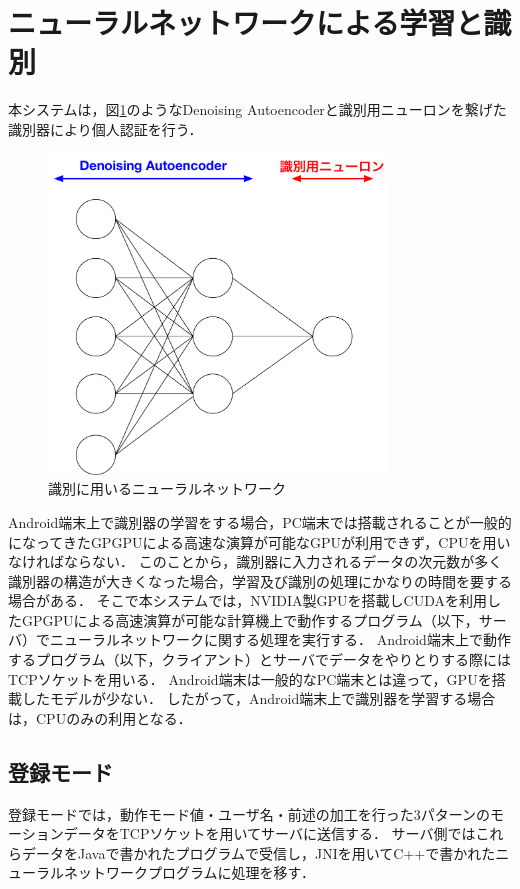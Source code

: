 \section{ニューラルネットワークによる学習と識別}
本システムは，図\ref{system-nn}のようなDenoising Autoencoderと識別用ニューロンを繋げた識別器により個人認証を行う．

\begin{figure}[bthp]
  \centering
  \includegraphics[bb=0 0 622 587, width=9cm]{Figures/system-nn.pdf}
  \caption{識別に用いるニューラルネットワーク}
  \label{system-nn}
\end{figure}

Android端末上で識別器の学習をする場合，PC端末では搭載されることが一般的になってきたGPGPUによる高速な演算が可能なGPUが利用できず，CPUを用いなければならない．
このことから，識別器に入力されるデータの次元数が多く識別器の構造が大きくなった場合，学習及び識別の処理にかなりの時間を要する場合がある．
そこで本システムでは，NVIDIA製GPUを搭載しCUDA\cite{4-cuda}を利用したGPGPUによる高速演算が可能な計算機上で動作するプログラム（以下，サーバ）でニューラルネットワークに関する処理を実行する．
Android端末上で動作するプログラム（以下，クライアント）とサーバでデータをやりとりする際にはTCPソケットを用いる．
Android端末は一般的なPC端末とは違って，GPUを搭載したモデルが少ない．
したがって，Android端末上で識別器を学習する場合は，CPUのみの利用となる．

\subsection{登録モード}
登録モードでは，動作モード値・ユーザ名・前述の加工を行った3パターンのモーションデータをTCPソケットを用いてサーバに送信する．
サーバ側ではこれらデータをJavaで書かれたプログラムで受信し，JNI\cite{4-jni}を用いてC++で書かれたニューラルネットワークプログラムに処理を移す．

